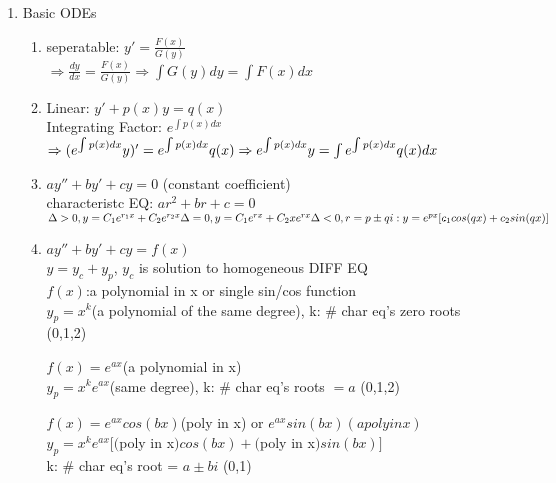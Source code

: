\documentclass[10pt]{article}
\begin{document}
  
\begin{multicols}{2}
	
\begin{enumerate}
	\item Basic ODEs
	\begin{enumerate}
		\item seperatable: $y'= \frac{F(x)}{G(y)}$\\
		$\Rightarrow \frac{dy}{dx} = \frac{F(x)}{G(y)} \Rightarrow \int G(y)dy = \int F(x)dx$
		
		\item Linear: $y'+p(x)y = q(x)$\\
		Integrating Factor: $e^{\int p(x)dx}$\\
		$\Rightarrow (e^{\int p(x)dx}y)' = e^{\int p(x)dx}q(x)\\ \Rightarrow
		e^{\int p(x)dx}y = \int e^{\int p(x)dx}q(x)dx$
		
		\item $ay'' + by' + cy = 0$ (constant coefficient)\\
		characteristc EQ: $ar^2 + br + c = 0$\\
		$\Delta > 0, y = C_1e^{r_1x} + C_2e^{r_2x}\\
		\Delta = 0, y = C_1e^{rx} + C_2xe^{rx}\\
		\Delta < 0, r = p \pm qi: y = e^{px}[c_1cos(qx)+c_2sin(qx)]$
		
		\item $ay'' + by' + cy = f(x)$ \\
		$y = y_c + y_p$, $y_c$ is solution to homogeneous DIFF EQ\\
		$f(x)$:a polynomial in x or single sin/cos function\\
		$y_p =  x^k$(a polynomial of the same degree), k: $\#$ char eq's zero roots (0,1,2)
		
		$f(x) = e^{ax}$(a polynomial in x)\\
		$y_p =  x^ke^{ax}$(same degree), k: $\#$ char eq's roots $= a$ (0,1,2)
		
		$f(x) = e^{ax}cos(bx)$(poly in x) or $e^{ax}sin(bx)(a poly in x)$\\
		$y_p = x^ke^{ax} [ ($poly in x$)cos(bx) + ($poly in x$)sin(bx) ]$\\
		k: $\#$ char eq's root = $a \pm bi$ (0,1)
		

\end{enumerate}
\end{enumerate}
\end{multicols}
\end{document}
